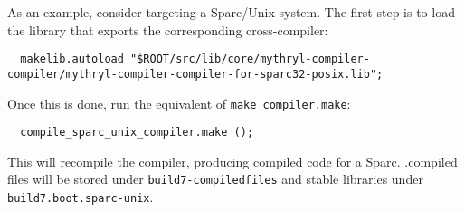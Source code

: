As an example, consider targeting a Sparc/Unix system.  The first step
is to load the library that exports the corresponding cross-compiler:

\begin{verbatim}
  makelib.autoload "$ROOT/src/lib/core/mythryl-compiler-compiler/mythryl-compiler-compiler-for-sparc32-posix.lib";
\end{verbatim}

Once this is done, run the equivalent of {\tt make_compiler.make}:

\begin{verbatim}
  compile_sparc_unix_compiler.make ();
\end{verbatim}

This will recompile the compiler, producing compiled code for a Sparc.
.compiled files will be stored under {\tt build7-compiledfiles} and stable
libraries under {\tt build7.boot.sparc-unix}.
